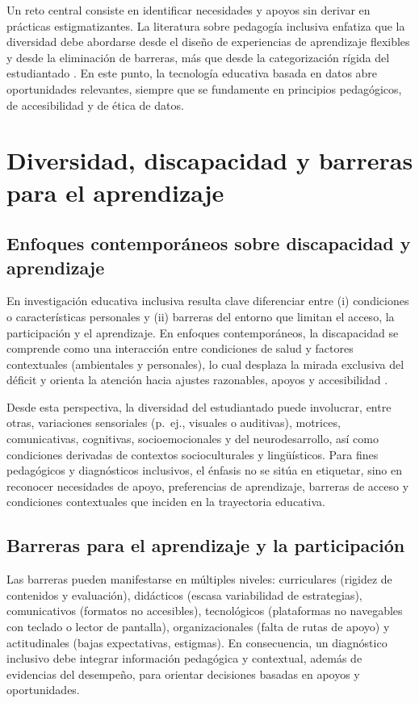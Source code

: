 \begin{refsection}
Un reto central consiste en identificar necesidades y apoyos sin derivar en prácticas estigmatizantes. La literatura sobre pedagogía inclusiva enfatiza que la diversidad debe abordarse desde el diseño de experiencias de aprendizaje flexibles y desde la eliminación de barreras, más que desde la categorización rígida del estudiantado \parencite{florian2011}. En este punto, la tecnología educativa basada en datos abre oportunidades relevantes, siempre que se fundamente en principios pedagógicos, de accesibilidad y de ética de datos.

\section{Diversidad, discapacidad y barreras para el aprendizaje}

\subsection{Enfoques contemporáneos sobre discapacidad y aprendizaje}

En investigación educativa inclusiva resulta clave diferenciar entre (i) condiciones o características personales y (ii) barreras del entorno que limitan el acceso, la participación y el aprendizaje. En enfoques contemporáneos, la discapacidad se comprende como una interacción entre condiciones de salud y factores contextuales (ambientales y personales), lo cual desplaza la mirada exclusiva del déficit y orienta la atención hacia ajustes razonables, apoyos y accesibilidad \parencite{whoicf2001}.

Desde esta perspectiva, la diversidad del estudiantado puede involucrar, entre otras, variaciones sensoriales (p.\ ej., visuales o auditivas), motrices, comunicativas, cognitivas, socioemocionales y del neurodesarrollo, así como condiciones derivadas de contextos socioculturales y lingüísticos. Para fines pedagógicos y diagnósticos inclusivos, el énfasis no se sitúa en etiquetar, sino en reconocer necesidades de apoyo, preferencias de aprendizaje, barreras de acceso y condiciones contextuales que inciden en la trayectoria educativa.

\subsection{Barreras para el aprendizaje y la participación}

Las barreras pueden manifestarse en múltiples niveles: curriculares (rigidez de contenidos y evaluación), didácticos (escasa variabilidad de estrategias), comunicativos (formatos no accesibles), tecnológicos (plataformas no navegables con teclado o lector de pantalla), organizacionales (falta de rutas de apoyo) y actitudinales (bajas expectativas, estigmas). En consecuencia, un diagnóstico inclusivo debe integrar información pedagógica y contextual, además de evidencias del desempeño, para orientar decisiones basadas en apoyos y oportunidades.


\end{refsection}
